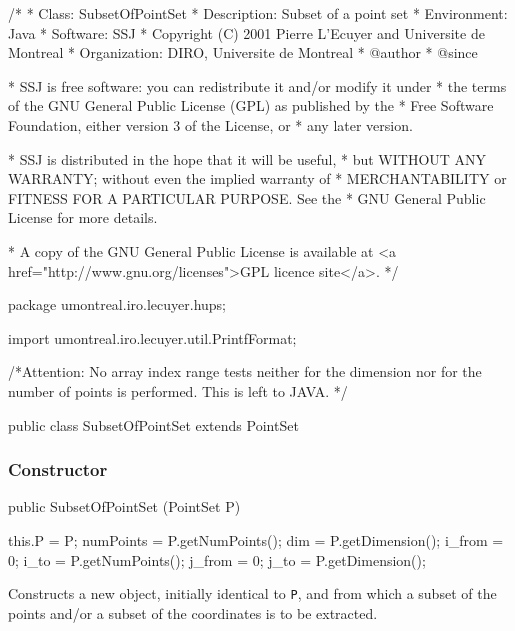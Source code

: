 \begin{code}
\begin{hide}
/*
 * Class:        SubsetOfPointSet
 * Description:  Subset of a point set
 * Environment:  Java
 * Software:     SSJ 
 * Copyright (C) 2001  Pierre L'Ecuyer and Universite de Montreal
 * Organization: DIRO, Universite de Montreal
 * @author       
 * @since

 * SSJ is free software: you can redistribute it and/or modify it under
 * the terms of the GNU General Public License (GPL) as published by the
 * Free Software Foundation, either version 3 of the License, or
 * any later version.

 * SSJ is distributed in the hope that it will be useful,
 * but WITHOUT ANY WARRANTY; without even the implied warranty of
 * MERCHANTABILITY or FITNESS FOR A PARTICULAR PURPOSE.  See the
 * GNU General Public License for more details.

 * A copy of the GNU General Public License is available at
   <a href="http://www.gnu.org/licenses">GPL licence site</a>.
 */
\end{hide}
package umontreal.iro.lecuyer.hups;\begin{hide}

import umontreal.iro.lecuyer.util.PrintfFormat;

 /*Attention: No array index range tests neither for the dimension
   nor for the number of points is performed. This is left to JAVA. */
\end{hide}

public class SubsetOfPointSet extends PointSet \begin{hide} {
   protected PointSet P;                  // Source points
   protected int i_from, i_to, i_index[]; // Limits or lookup for row
   protected int j_from, j_to, j_index[]; // Limits or lookup for column

\end{hide}
\end{code}

\subsubsection*{Constructor}
\begin{code}

   public SubsetOfPointSet (PointSet P) \begin{hide} {
      this.P = P;
      numPoints = P.getNumPoints();
      dim = P.getDimension();
      i_from = 0;
      i_to = P.getNumPoints();
      j_from = 0;
      j_to = P.getDimension();
   }\end{hide}
\end{code}
 \begin{tabb}
   Constructs a new  object, initially identical to \texttt{P}, 
   and from which a subset of the points and/or a subset of the coordinates 
   is to be extracted.  
 \end{tabb}
\begin{htmlonly}
\end{htmlonly}
 
